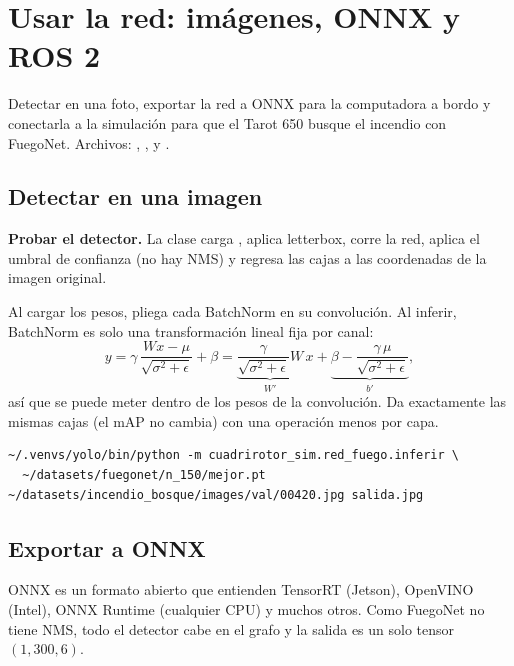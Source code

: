 \chapter{Usar la red: imágenes, ONNX y ROS 2}
\label{cap:integrar}

\begin{enpocas}
Detectar en una foto, exportar la red a ONNX para la computadora a bordo y
conectarla a la simulación para que el Tarot 650 busque el incendio con
FuegoNet. Archivos: , ,
 y .
\end{enpocas}

\section{Detectar en una imagen}

 \textbf{Probar el detector.}
La clase  carga , aplica letterbox, corre la red,
aplica el umbral de confianza (no hay NMS) y regresa las cajas a las coordenadas
de la imagen original.

Al cargar los pesos,  pliega cada BatchNorm en su convolución.
Al inferir, BatchNorm es solo una transformación lineal fija por canal:
\begin{equation}
y = \gamma\,\frac{W x - \mu}{\sqrt{\sigma^2+\epsilon}} + \beta
  = \underbrace{\frac{\gamma}{\sqrt{\sigma^2+\epsilon}}W}_{W'}\,x
  + \underbrace{\beta - \frac{\gamma\,\mu}{\sqrt{\sigma^2+\epsilon}}}_{b'},
\end{equation}
así que se puede meter dentro de los pesos de la convolución. Da exactamente las
mismas cajas (el mAP no cambia) con una operación menos por capa.

\begin{lstlisting}[style=bash]
~/.venvs/yolo/bin/python -m cuadrirotor_sim.red_fuego.inferir \
  ~/datasets/fuegonet/n_150/mejor.pt ~/datasets/incendio_bosque/images/val/00420.jpg salida.jpg
\end{lstlisting}



\section{Exportar a ONNX}

ONNX es un formato abierto que entienden TensorRT (Jetson), OpenVINO (Intel),
ONNX Runtime (cualquier CPU) y muchos otros. Como FuegoNet no tiene NMS, todo el
detector cabe en el grafo y la salida es un solo tensor $(1, 300, 6)$.

